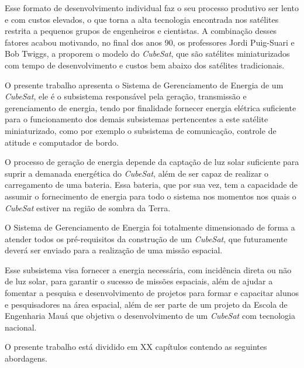 \documentclass[
	12pt,				%
	openright,			%
	oneside,			%
	a4paper,			%
	english,			%
	french,				%
	spanish,			%
	brazil,				%
	oldfontcommands
	]{abntex2}
\begin{document}
	Esse formato de desenvolvimento individual faz o seu processo produtivo ser lento e com custos elevados, o que torna a alta tecnologia encontrada nos satélites restrita a pequenos grupos de engenheiros e cientistas. A combinação desses fatores acabou motivando, no final dos anos 90, os professores Jordi Puig-Suari e Bob Twiggs, a proporem o modelo do \textit{CubeSat}, que são satélites miniaturizados com tempo de desenvolvimento e custos bem abaixo dos satélites tradicionais.
	
	O presente trabalho apresenta o Sistema de Gerenciamento de Energia de um \textit{CubeSat}, ele é o subsistema responsável pela geração, transmissão e gerenciamento de energia, tendo por finalidade fornecer energia elétrica suficiente para o funcionamento dos demais subsistemas pertencentes a este satélite miniaturizado, como por exemplo o subsistema de comunicação, controle de atitude e computador de bordo.
	
	O processo de geração de energia depende da captação de luz solar suficiente para suprir a demanada energética do \textit{CubeSat}, além de ser capaz de realizar o carregamento de uma bateria. Essa bateria, que por sua vez, tem a capacidade de assumir o fornecimento de energia para todo o sistema nos momentos nos quais o \textit{CubeSat} estiver na região de sombra da Terra.
	
	O Sistema de Gerenciamento de Energia foi totalmente dimensionado de forma a atender todos os pré-requisitos da construção de um \textit{CubeSat}, que futuramente deverá ser enviado para a realização de uma missão espacial.


	Esse subsistema visa fornecer a energia necessária, com incidência direta ou não de luz solar, para garantir o sucesso de missões espaciais, além de ajudar a fomentar a pesquisa e desenvolvimento de projetos para formar e capacitar alunos e pesquisadores na área espacial, além de ser parte de um projeto da Escola de Engenharia Mauá que objetiva o desenvolvimento de um \textit{CubeSat} com tecnologia nacional.
	
	O presente trabalho está dividido em XX capítulos contendo as seguintes abordagens.
\end{document}
